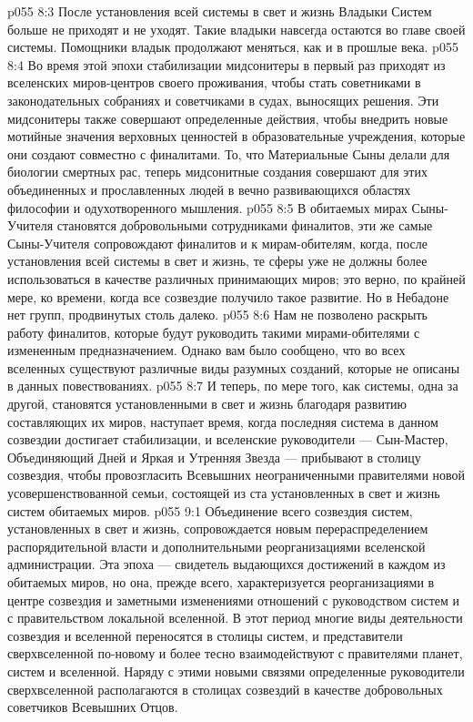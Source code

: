 \vs p055 8:3 После установления всей системы в свет и жизнь Владыки Систем больше не приходят и не уходят. Такие владыки навсегда остаются во главе своей системы. Помощники владык продолжают меняться, как и в прошлые века.
\vs p055 8:4 Во время этой эпохи стабилизации мидсонитеры в первый раз приходят из вселенских миров\hyp{}центров своего проживания, чтобы стать советниками в законодательных собраниях и советчиками в судах, выносящих решения. Эти мидсонитеры также совершают определенные действия, чтобы внедрить новые мотийные значения верховных ценностей в образовательные учреждения, которые они создают совместно с финалитами. То, что Материальные Сыны делали для биологии смертных рас, теперь мидсонитные создания совершают для этих объединенных и прославленных людей в вечно развивающихся областях философии и одухотворенного мышления.
\vs p055 8:5 \pc В обитаемых мирах Сыны\hyp{}Учителя становятся добровольными сотрудниками финалитов, эти же самые Сыны\hyp{}Учителя сопровождают финалитов и к мирам\hyp{}обителям, когда, после установления всей системы в свет и жизнь, те сферы уже не должны более использоваться в качестве различных принимающих миров; это верно, по крайней мере, ко времени, когда все созвездие получило такое развитие. Но в Небадоне нет групп, продвинутых столь далеко.
\vs p055 8:6 Нам не позволено раскрыть работу финалитов, которые будут руководить такими мирами\hyp{}обителями с измененным предназначением. Однако вам было сообщено, что во всех вселенных существуют различные виды разумных созданий, которые не описаны в данных повествованиях.
\vs p055 8:7 \pc И теперь, по мере того, как системы, одна за другой, становятся установленными в свет и жизнь благодаря развитию составляющих их миров, наступает время, когда последняя система в данном созвездии достигает стабилизации, и вселенские руководители --- Сын\hyp{}Мастер, Объединяющий Дней и Яркая и Утренняя Звезда --- прибывают в столицу созвездия, чтобы провозгласить Всевышних неограниченными правителями новой усовершенствованной семьи, состоящей из ста установленных в свет и жизнь систем обитаемых миров.
\vs p055 9:1 Объединение всего созвездия систем, установленных в свет и жизнь, сопровождается новым перераспределением распорядительной власти и дополнительными реорганизациями вселенской администрации. Эта эпоха --- свидетель выдающихся достижений в каждом из обитаемых миров, но она, прежде всего, характеризуется реорганизациями в центре созвездия и заметными изменениями отношений с руководством систем и с правительством локальной вселенной. В этот период многие виды деятельности созвездия и вселенной переносятся в столицы систем, и представители сверхвселенной по\hyp{}новому и более тесно взаимодействуют с правителями планет, систем и вселенной. Наряду с этими новыми связями определенные руководители сверхвселенной располагаются в столицах созвездий в качестве добровольных советчиков Всевышних Отцов.
